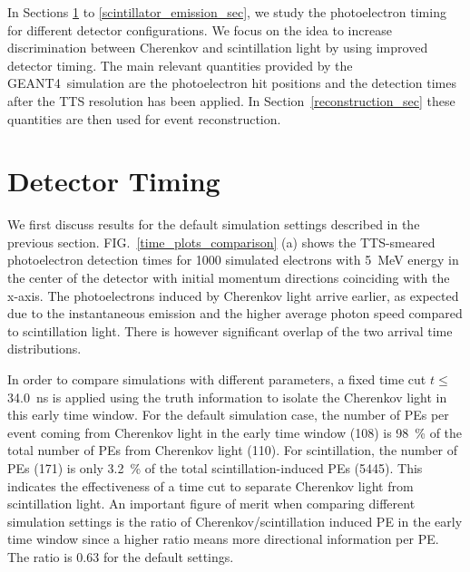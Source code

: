 \documentclass[aps,prc,twocolumn,groupedaddress,showpacs,amsmath,amssymb,floatfix,superscriptaddress]{revtex4}
\newcommand{\GEANT}{GEANT4}
\begin{document}
In Sections \ref{detector_timing_sec} to
\ref{scintillator_emission_sec}, we study the
photoelectron timing for different detector configurations. We focus on
the idea to increase discrimination between Cherenkov and scintillation
light by using improved detector timing. The main relevant quantities
provided by the \GEANT~simulation are the photoelectron hit positions
and the detection times after the TTS resolution has been applied. In
Section~\ref{reconstruction_sec} these quantities are then used for event
reconstruction.

\section{Detector Timing}
\label{detector_timing_sec}

We first discuss results for the default simulation settings described
in the previous section. FIG.~\ref{time_plots_comparison} (a) shows
the TTS-smeared photoelectron detection times for 1000 simulated
electrons with 5~MeV energy in the center of the detector with initial
momentum directions coinciding with the x-axis. The photoelectrons
induced by Cherenkov light arrive earlier, as expected due to the
instantaneous emission and the higher average photon speed compared to scintillation light. There is however
significant overlap of the two arrival time distributions.  

In order to compare simulations with different parameters, a fixed time cut $t
\leq$ 34.0~ns  is applied using the truth information to isolate the Cherenkov light in this early time window. For the default
simulation case, the number of PEs per event coming from Cherenkov
light in the early time window (108) is 98~\% of the total number of
PEs from Cherenkov light (110). For scintillation, the number of PEs (171) is only 3.2~\% of the total
scintillation-induced PEs (5445). This indicates the effectiveness of
a time cut to separate Cherenkov light from scintillation light. An
important figure of merit when comparing different simulation settings
is the ratio of Cherenkov/scintillation induced PE in the early time window since a higher ratio means more directional information per
PE. The ratio is 0.63 for the default settings. 
\end{document}
